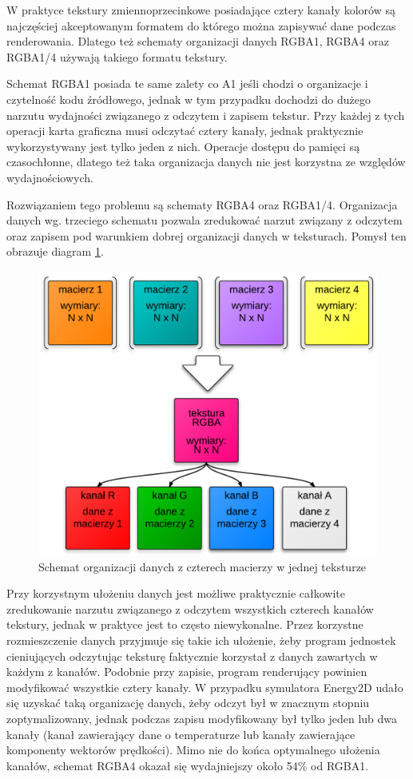 W praktyce tekstury zmiennoprzecinkowe posiadające cztery kanały kolorów są
najczęściej akceptowanym formatem do którego można zapisywać dane podczas
renderowania. Dlatego też schematy organizacji danych RGBA1, RGBA4 oraz RGBA1/4
używają takiego formatu tekstury.

Schemat RGBA1 posiada te same zalety co A1 jeśli chodzi o organizacje i
czytelność kodu źródłowego, jednak w tym przypadku dochodzi do dużego narzutu
wydajności związanego z odczytem i zapisem tekstur. Przy każdej z tych operacji
karta graficzna musi odczytać cztery kanały, jednak praktycznie wykorzystywany
jest tylko jeden z nich. Operacje dostępu do pamięci są czasochłonne, dlatego
też taka organizacja danych nie jest korzystna ze względów wydajnościowych.

Rozwiązaniem tego problemu są schematy RGBA4 oraz RGBA1/4. Organizacja danych
wg. trzeciego schematu pozwala zredukować narzut związany z odczytem oraz
zapisem pod warunkiem dobrej organizacji danych w teksturach. Pomysł ten
obrazuje diagram \ref{fig:rgba4Tex}. 

\begin{figure}[hbp]
\centering
\includegraphics[width=.9\textwidth]{img/rgba4Tex}
\caption{Schemat organizacji danych z czterech macierzy w jednej teksturze}
\label{fig:rgba4Tex}
\end{figure}

Przy korzystnym ułożeniu danych jest możliwe praktycznie całkowite zredukowanie
narzutu związanego z odczytem wszystkich czterech kanałów tekstury, jednak w
praktyce jest to często niewykonalne. Przez korzystne rozmieszczenie danych
przyjmuje się takie ich ułożenie, żeby program jednostek cieniujących odczytując
teksturę faktycznie korzystał z danych zawartych w każdym z kanałów. Podobnie
przy zapisie, program renderujący powinien modyfikować wszystkie cztery kanały.
W przypadku symulatora Energy2D udało się uzyskać taką organizację danych, żeby
odczyt był w znacznym stopniu zoptymalizowany, jednak podczas zapisu
modyfikowany był tylko jeden lub dwa kanały (kanał zawierający dane o
temperaturze lub kanały zawierające komponenty wektorów prędkości). Mimo nie do
końca optymalnego ułożenia kanałów, schemat RGBA4 okazał się wydajniejszy około
54\% od RGBA1.

